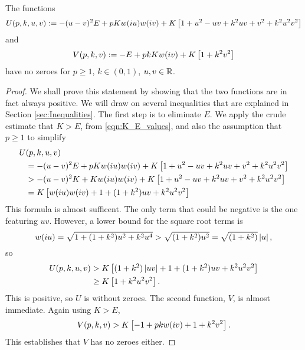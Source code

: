 \begin{lem}
    \label{lem:deriv no zeroes}
The functions
\[
U(p,k,u,v) := -(u-v)^2 E + pKw(i u)w(i v) + K\left[ 1 + u^2 - uv + k^2 uv + v^2 + k^2 u^2 v^2 \right]
\]
and
\[
V(p,k,v) := -E + pkKw(i v) + K\left[ 1 + k^2v^2 \right]
\]
have no zeroes for $p \geq 1$, $k\in (0,1)$, $u,v \in \R$.
\begin{proof}
We shall prove this statement by showing that the two functions are in fact always positive. We will draw on several inequalities that are explained in Section \ref{sec:Inequalities}. The first step is to eliminate $E$. We apply the crude estimate that $K>E$, from \eqref{eqn:K_E_values}, and also the assumption that $p\geq 1$ to simplify
\begin{align*}
U&(p,k,u,v)\\
&= -(u-v)^2 E + pKw(i u)w(i v) + K\left[ 1 + u^2 - uv + k^2 uv + v^2 + k^2 u^2 v^2 \right] \\
&> -(u-v)^2 K + Kw(i u)w(i v) + K\left[ 1 + u^2 - uv + k^2 uv + v^2 + k^2 u^2 v^2 \right] \\
&= K \left[ w(i u)w(i v) + 1 + (1 + k^2) uv + k^2 u^2 v^2 \right]
\end{align*}
This formula is almost sufficent. The only term that could be negative is the one featuring $uv$. However, a lower bound for the square root terms is
\[
w(i u) = \sqrt{1 + (1+k^2)u^2 + k^2u^4} > \sqrt{(1+k^2)u^2} = \sqrt{(1+k^2)}\left|u\right|,
\]
so
\begin{align*}
U(p,k,u,v)
&> K \left[ (1+k^2)\left|uv\right| + 1 + (1 + k^2) uv + k^2 u^2 v^2 \right] \\
&\geq K \left[ 1 + k^2 u^2 v^2 \right].
\end{align*}
This is positive, so $U$ is without zeroes. The second function, $V$, is almost immediate. Again using $K>E$,
\[
V(p,k,v) > K \left[ -1 + pk w(i v) + 1 + k^2 v^2\right].
\]
This establishes that $V$ has no zeroes either.
\end{proof}
\end{lem}



